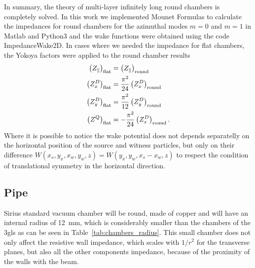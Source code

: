     In summary, the theory of multi-layer infinitely long round chambers is completely solved. In this work we implemented Mounet Formulas to calculate the impedances for round chambers for the azimuthal modes $m=0$ and $m=1$ in Matlab and Python3 and the wake functions were obtained using the code ImpedanceWake2D. In cases where we needed the impedance for flat chambers, the Yokoya factors were applied to the round chamber results
    \begin{align}
        \left(Z_\parallel\right)_\text{flat} &=
                        \left(Z_\parallel\right)_\text{round}\\
        \left(Z_x^D\right)_\text{flat} &= \frac{\pi^2}{24}
                        \left(Z_x^D\right)_\text{round}\\
        \left(Z_y^D\right)_\text{flat} &= \frac{\pi^2}{12}
                        \left(Z_y^D\right)_\text{round}\\
        \left(Z^Q\right)_\text{flat} &= -\frac{\pi^2}{24}
                        \left(Z_x^D\right)_\text{round}.
    \end{align}
    Where it is possible to notice the wake potential does not depends separatelly on the horizontal position of the source and witness particles, but only on their difference $W(x_s,y_x,x_w,y_w,z)=W(y_x,y_w,x_s-x_w,z)$ to respect the condition of translational symmetry in the horizontal direction.

\subsection{Pipe}

    Sirius standard vacuum chamber will be round, made of copper and will have an internal radius of \SI{12}{\milli\meter}, which is considerably smaller than the chambers of the \gls{3gls} as can be seen in Table~\ref{tab:chambers_radius}. This small chamber does not only affect the resistive wall impedance, which scales with $1/r^2$ for the transverse planes, but also all the other components impedance, because of the proximity of the walls with the beam.

